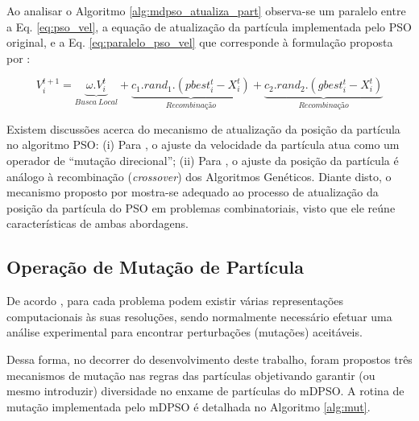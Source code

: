 \documentclass[
	12pt,				%
	openany,			%
	oneside,	
	a4paper,			%
	brazil,				%
	]{unimontes-ppgmsc-abntex2}
\begin{document}
Ao analisar o Algoritmo \ref{alg:mdpso_atualiza_part} observa-se um paralelo entre a Eq. \ref{eq:pso_vel}, a equação de atualização da partícula implementada pelo PSO original, e a Eq. \ref{eq:paralelo_pso_vel} que corresponde à formulação proposta por :

\begin{equation}
\label{eq:paralelo_pso_vel}
V^{t+1}_{i} = \underbrace{\omega . V^{t}_{i}}_{Busca\ Local} + \underbrace{c_1 . rand_1 . (pbest^{t}_{i} - X^{t}_{i})}_{Recombinação} + \underbrace{c_2 . rand_2 . (gbest^{t}_{i} - X^{t}_{i})}_{Recombinação}
\end{equation}

Existem discussões acerca do mecanismo de atualização da posição da partícula no algoritmo PSO: (i) Para , o ajuste da velocidade da partícula atua como um operador de ``mutação direcional''; (ii) Para , o ajuste da posição da partícula é análogo à recombinação ({\em crossover}) dos Algoritmos Genéticos. Diante disto, o mecanismo proposto por  mostra-se adequado ao processo de atualização da posição da partícula do PSO em problemas combinatoriais, visto que ele reúne características de ambas abordagens.

\subsection{Operação de Mutação de Partícula}
\label{sec:mdpso_mutacao}

De acordo , para cada problema podem existir várias representações computacionais às suas resoluções, sendo normalmente necessário efetuar uma análise experimental para encontrar perturbações (mutações) aceitáveis. 

Dessa forma, no decorrer do desenvolvimento deste trabalho, foram propostos três mecanismos de mutação nas regras das partículas objetivando garantir (ou mesmo introduzir) diversidade no enxame de partículas do mDPSO. A rotina de mutação implementada pelo mDPSO é detalhada no Algoritmo \ref{alg:mut}.
\end{document}

